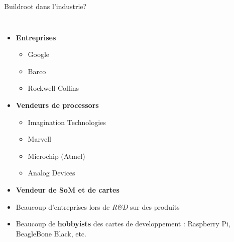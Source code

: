 \begin{frame}{Buildroot dans l'industrie?}
  \begin{columns}
    \begin{itemize}
    \item {\bf Entreprises}
      \begin{itemize}
      \item Google
      \item Barco
      \item Rockwell Collins
      \end{itemize}
    \item {\bf Vendeurs de processors}
      \begin{itemize}
      \item Imagination Technologies
      \item Marvell
      \item Microchip (Atmel)
      \item Analog Devices
      \end{itemize}
    \item {\bf Vendeur de SoM et de cartes}
    \item Beaucoup d'entreprises lors de {\em R\&D} sur des produits
    \item Beaucoup de {\bf hobbyists} des cartes de developpement :
      Raspberry Pi, BeagleBone Black, etc.
  \end{itemize}
  \\
  \\

\end{columns}
\end{frame}
